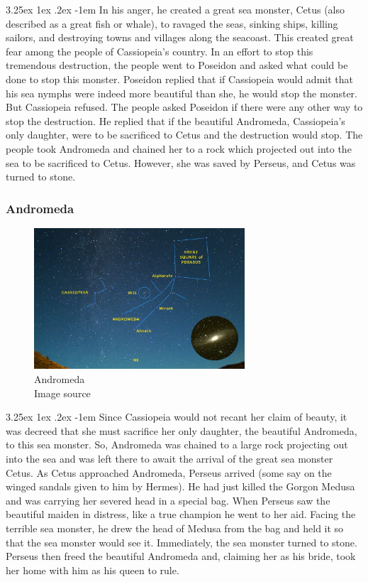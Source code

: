 \documentclass[a4paper,twoside,11pt]{article}
\makeatletter
\numberwithin{equation}{section}
\renewcommand\paragraph{\@startsection{paragraph}{5}{\z@}%
  {3.25ex \@plus1ex \@minus.2ex}%
  {-1em}%
  {\normalfont\normalsize\bfseries}}
\makeatother
\begin{document}
\paragraph{}
In his anger, he created a great sea monster, Cetus (also described as a great fish or whale), to ravaged the seas, sinking ships, killing sailors, and destroying towns and villages along the seacoast. This created great fear among the people of Cassiopeia's country. In an effort to stop this tremendous destruction, the people went to Poseidon and asked what could be done to stop this monster. Poseidon replied that if Cassiopeia would admit that his sea nymphs were indeed more beautiful than she, he would stop the monster. But Cassiopeia refused. The people asked Poseidon if there were any other way to stop the destruction. He replied that if the beautiful Andromeda, Cassiopeia's only daughter, were to be sacrificed to Cetus and the destruction would stop. The people took Andromeda and chained her to a rock which projected out into the sea to be sacrificed to Cetus. However, she was saved by Perseus, and Cetus was turned to stone.

\subsubsection{Andromeda}
\begin{figure}[h]
\centering
\includegraphics[width=0.7\textwidth]{fig16.jpg}
\caption{Andromeda \\ Image source \cite{Andro}}
\label{fig16}
\end{figure}
\paragraph{}
Since Cassiopeia would not recant her claim of beauty, it was decreed that she must sacrifice her only daughter, the beautiful Andromeda, to this sea monster. So, Andromeda was chained to a large rock projecting out into the sea and was left there to await the arrival of the great sea monster Cetus. As Cetus approached Andromeda, Perseus arrived (some say on the winged sandals given to him by Hermes). He had just killed the Gorgon Medusa and was carrying her severed head in a special bag. When Perseus saw the beautiful maiden in distress, like a true champion he went to her aid. Facing the terrible sea monster, he drew the head of Medusa from the bag and held it so that the sea monster would see it. Immediately, the sea monster turned to stone. Perseus then freed the beautiful Andromeda and, claiming her as his bride, took her home with him as his queen to rule.
\end{document}
